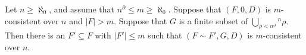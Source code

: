 Let $n \geq \aleph_0$, and assume that $n^{\partial} \leq m \geq \aleph_0$. Suppose that $(F, 0, D)$ is $m$-consistent over $n$ and $|F| > m$. Suppose that $G$ is a finite subset of $\bigcup_{\rho < n^{\partial}} {}^n \rho$. Then there is an $F' \subseteq F$ with $|F'| \leq m$ such that $(F \sim F', G, D)$ is $m$-consistent over $n$.
